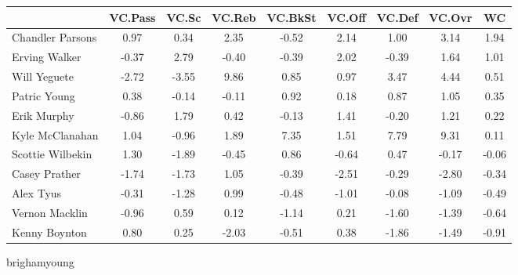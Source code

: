 \documentclass[10pt,letterpaper]{article}
\begin{document}
\begin{table}[ht]
\begin{center}
\begin{tabular}{lcccccccc}
  \hline
 & VC.Pass & VC.Sc & VC.Reb & VC.BkSt & VC.Off & VC.Def & VC.Ovr & WC \\ 
  \hline
Chandler Parsons & 0.97 & 0.34 & 2.35 & -0.52 & 2.14 & 1.00 & 3.14 & 1.94 \\ 
  Erving Walker & -0.37 & 2.79 & -0.40 & -0.39 & 2.02 & -0.39 & 1.64 & 1.01 \\ 
  Will Yeguete & -2.72 & -3.55 & 9.86 & 0.85 & 0.97 & 3.47 & 4.44 & 0.51 \\ 
  Patric Young & 0.38 & -0.14 & -0.11 & 0.92 & 0.18 & 0.87 & 1.05 & 0.35 \\ 
  Erik Murphy & -0.86 & 1.79 & 0.42 & -0.13 & 1.41 & -0.20 & 1.21 & 0.22 \\ 
  Kyle McClanahan & 1.04 & -0.96 & 1.89 & 7.35 & 1.51 & 7.79 & 9.31 & 0.11 \\ 
  Scottie Wilbekin & 1.30 & -1.89 & -0.45 & 0.86 & -0.64 & 0.47 & -0.17 & -0.06 \\ 
  Casey Prather & -1.74 & -1.73 & 1.05 & -0.39 & -2.51 & -0.29 & -2.80 & -0.34 \\ 
  Alex Tyus & -0.31 & -1.28 & 0.99 & -0.48 & -1.01 & -0.08 & -1.09 & -0.49 \\ 
  Vernon Macklin & -0.96 & 0.59 & 0.12 & -1.14 & 0.21 & -1.60 & -1.39 & -0.64 \\ 
  Kenny Boynton & 0.80 & 0.25 & -2.03 & -0.51 & 0.38 & -1.86 & -1.49 & -0.91 \\ 
   \hline
\end{tabular}
\end{center}
\end{table}
\newpage
\begin{center}
brighamyoung 
\end{center}
\end{document}
